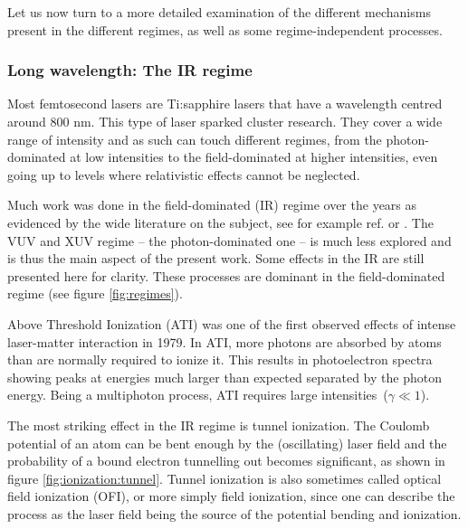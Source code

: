 Let us now turn to a more detailed examination of the different mechanisms
present in the different regimes, as well as some regime-independent processes.



\subsubsection{Long wavelength: The IR regime}
\label{section:intro:mechanisms:ir}

Most femtosecond lasers are Ti:sapphire lasers that have a wavelength centred around 800 nm.
This type of laser sparked cluster research. They cover a wide range of
intensity and as such can touch different regimes, from the photon-dominated
at low intensities to the field-dominated at higher intensities,
even going up to levels where relativistic effects cannot be neglected.

Much work was done in the field-dominated (IR) regime over the
years as evidenced by the wide literature on the subject, see for example ref.
\cite{Fennel2010} or \cite{Ramunno2008}. The VUV and XUV regime
-- the photon-dominated one -- is much less explored and is thus the main
aspect of the present work. Some effects in the IR are still presented here
for clarity. These processes are dominant in the field-dominated regime (see
figure \ref{fig:regimes}).



Above Threshold Ionization (ATI) was one of the first observed effects of
intense laser-matter interaction in 1979\cite{Agostini1979}.
In ATI, more photons are absorbed by atoms
than are normally required to ionize it. This results in photoelectron spectra
showing peaks at energies much larger than expected separated by the photon
energy. Being a multiphoton process, ATI requires large
intensities~($\gamma \ll 1$)\cite{Krainov1997,Lewenstein2008}.



The most striking effect in the IR regime is tunnel ionization\cite{Niikura2009}.
The Coulomb potential of an atom can be bent enough by the (oscillating) laser
field and the probability of a bound electron tunnelling out becomes significant,
as shown in figure \ref{fig:ionization:tunnel}. Tunnel ionization is also
sometimes called optical field ionization (OFI), or more simply field
ionization, since one can describe the process as the laser field being the source
of the potential bending and ionization.


